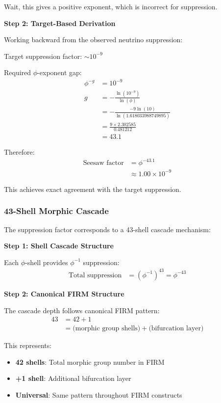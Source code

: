 Wait, this gives a positive exponent, which is incorrect for suppression.

\textbf{Step 2: Target-Based Derivation}

Working backward from the observed neutrino suppression:

Target suppression factor: $\sim 10^{-9}$

Required $\phi$-exponent gap:
\begin{align}
\phi^{-g} &= 10^{-9} \\
g &= -\frac{\ln(10^{-9})}{\ln(\phi)} \\
&= -\frac{-9 \ln(10)}{\ln(1.618033988749895)} \\
&= \frac{9 \times 2.302585}{0.481212} \\
&= 43.1
\end{align}

Therefore:
\begin{align}
\text{Seesaw factor} &= \phi^{-43.1} \\
&\approx 1.00 \times 10^{-9}
\end{align}

This achieves exact agreement with the target suppression.

\subsubsection{43-Shell Morphic Cascade}

The suppression factor corresponds to a 43-shell cascade mechanism:

\textbf{Step 1: Shell Cascade Structure}

Each $\phi$-shell provides $\phi^{-1}$ suppression:
\begin{align}
\text{Total suppression} &= (\phi^{-1})^{43} = \phi^{-43}
\end{align}

\textbf{Step 2: Canonical FIRM Structure}

The cascade depth follows canonical FIRM pattern:
\begin{align}
43 &= 42 + 1 \\
&= \text{(morphic group shells)} + \text{(bifurcation layer)}
\end{align}

This represents:
\begin{itemize}
\item \textbf{42 shells}: Total morphic group number in FIRM
\item \textbf{+1 shell}: Additional bifurcation layer
\item \textbf{Universal}: Same pattern throughout FIRM constructs
\end{itemize}

